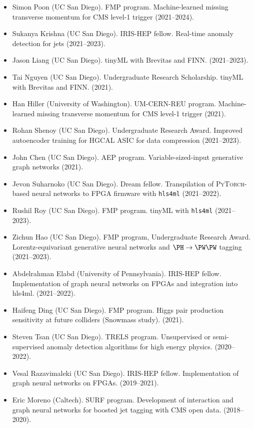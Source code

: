 \documentclass[11pt]{res}
\begin{document}
\begin{resume}
\begin{itemize}
    \item Simon Poon (UC San Diego). FMP program. Machine-learned missing transverse momentum for CMS level-1 trigger ({2021--2024}).
    \item Sukanya Krishna (UC San Diego). IRIS-HEP fellow. Real-time anomaly detection for jets ({2021--2023}).
    \item Jason Liang (UC San Diego). tinyML with Brevitas and FINN. ({2021--2023}).
    \item Tai Nguyen (UC San Diego). Undergraduate Research Scholarship. tinyML with Brevitas and FINN. ({2021}).
    \item Han Hiller (University of Washington). UM-CERN-REU program. Machine-learned missing transverse momentum for CMS level-1 trigger ({2021}).
    \item Rohan Shenoy (UC San Diego). Undergraduate Research Award. Improved autoencoder training for HGCAL ASIC for data compression ({2021--2023}).
    \item John Chen (UC San Diego). AEP program. Variable-sized-input generative graph networks ({2021}).
    \item Jevon Suharnoko (UC San Diego). Dream fellow. Transpilation of \textsc{PyTorch}-based neural networks to FPGA firmware with \texttt{hls4ml} ({2021--2022}).
    \item Rushil Roy (UC San Diego). FMP program. tinyML with \texttt{hls4ml} ({2021--2023}).
    \item Zichun Hao (UC San Diego). FMP program, Undergraduate Research Award. Lorentz-equivariant generative neural networks and $\PH\to\PW\PW$ tagging ({2021--2023}).
    \item Abdelrahman Elabd (University of Pennsylvania). IRIS-HEP fellow. Implementation of graph neural networks on FPGAs and integration into hls4ml. ({2021--2022}).
    \item Haifeng Ding (UC San Diego). FMP program. Higgs pair production sensitivity at future colliders (Snowmass study). ({2021}).
    \item Steven Tsan (UC San Diego). TRELS program. Unsupervised or semi-supervised anomaly detection algorithms for high energy physics. ({2020--2022}).
    \item Vesal Razavimaleki (UC San Diego). IRIS-HEP fellow. Implementation of graph neural networks on FPGAs. ({2019--2021}).
    \item Eric Moreno (Caltech). SURF program. Development of interaction and graph neural networks for boosted jet tagging with CMS open data. ({2018--2020}).

\end{itemize}
\end{resume}
\end{document}
